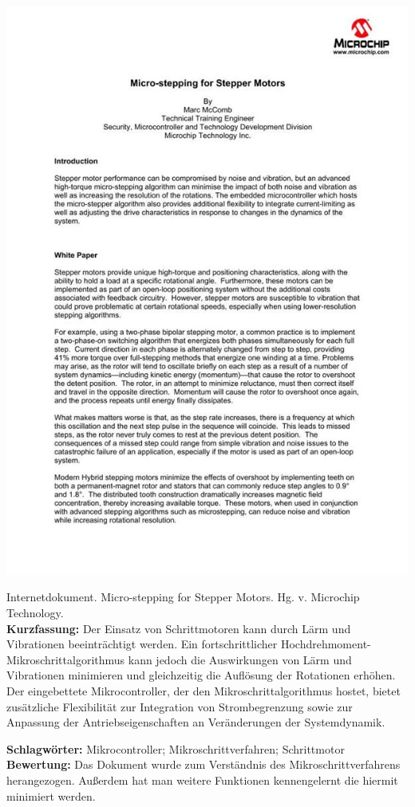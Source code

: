 {
	\begin{minipage}{0.38\textwidth}
		\includegraphics[width=\linewidth]{images/McCoumb.jpg}
	\end{minipage}
	\hfill
	\begin{minipage}{0.6\textwidth}
		Internetdokument. Micro-stepping for Stepper Motors. Hg. v. Microchip Technology.
\\ \textbf{Kurzfassung:}
		Der Einsatz von Schrittmotoren kann durch Lärm und Vibrationen beeinträchtigt werden. Ein fortschrittlicher Hochdrehmoment-Mikroschrittalgorithmus kann jedoch die Auswirkungen von Lärm und Vibrationen minimieren und gleichzeitig die Auflösung der Rotationen erhöhen. Der eingebettete Mikrocontroller, der den Mikroschrittalgorithmus hostet, bietet zusätzliche Flexibilität zur Integration von Strombegrenzung sowie zur Anpassung der Antriebseigenschaften an Veränderungen der Systemdynamik.
	\end{minipage}
	\textbf{Schlagwörter:}
	Mikrocontroller; Mikroschrittverfahren; Schrittmotor
	\\ \textbf{Bewertung:}
	Das Dokument wurde zum Verständnis des Mikroschrittverfahrens herangezogen. Außerdem hat man weitere Funktionen kennengelernt die hiermit minimiert werden.
}

